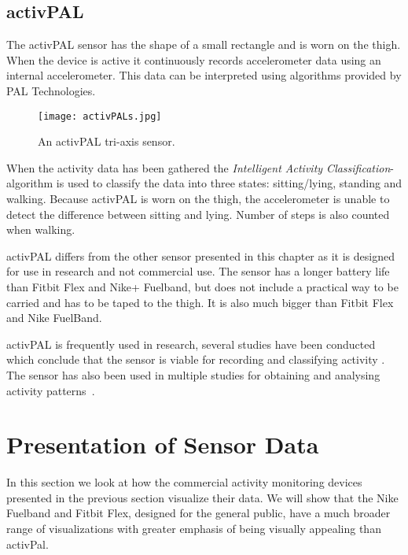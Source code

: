 \subsection{activPAL}
\label{sensorActivPal}
The activPAL sensor has the shape of a small rectangle and is worn on the thigh. When the device is active it continuously records accelerometer data using an internal accelerometer. This data can be interpreted using algorithms provided by PAL Technologies.

\begin{figure}[h!]
	\centering
		\texttt{[image: activPALs.jpg]}
		\caption[activPal sensor]{An activPAL tri-axis sensor.}
		\label{fig:activPal}
\end{figure}

When the activity data has been gathered the \emph{Intelligent Activity Classification}-algorithm is used to classify the data into three states: sitting/lying, standing and walking. Because activPAL is worn on the thigh, the accelerometer is unable to detect the difference between sitting and lying. Number of steps is also counted when walking.

activPAL differs from the other sensor presented in this chapter as it is designed for use in research and not commercial use. The sensor has a longer battery life than Fitbit Flex and Nike+ Fuelband, but does not include a practical way to be carried and has to be taped to the thigh. It is also much bigger than Fitbit Flex and Nike FuelBand. 

activPAL is frequently used in research, several studies have been conducted which conclude that the sensor is viable for recording and classifying activity \cite{grant2006, ryan2006, grant2008, tsavourelou}. The sensor has also been used in multiple studies for obtaining and analysing activity patterns~\cite{grant2010, lord, ryan2010}.

\section{Presentation of Sensor Data}
In this section we look at how the commercial activity monitoring devices presented in the previous section visualize their data. We will show that the Nike Fuelband and Fitbit Flex, designed for the general public, have a much broader range of visualizations with greater emphasis of being visually appealing than activPal.

